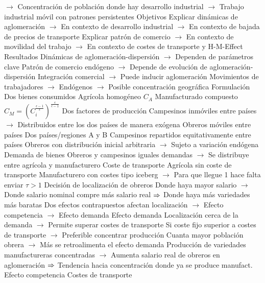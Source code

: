 \documentclass{nuevotema}
\begin{document}
\begin{esquemal}
				\4[] $\to$ Concentración de población donde hay desarrollo industrial
				\4[] $\to$ Trabajo industrial móvil con patrones persistentes
				\4 Objetivos
				\4[] Explicar dinámicas de aglomeración
				\4[] $\to$ En contexto de desarrollo industrial
				\4[] $\to$ En contexto de bajada de precios de transporte
				\4[] Explicar patrón de comercio
				\4[] $\to$ En contexto de movilidad del trabajo
				\4[] $\to$ En contexto de costes de transporte y H-M-Effect
				\4 Resultados
				\4[] Dinámicas de aglomeración-dispersión
				\4[] $\to$ Dependen de parámetros clave
				\4[] Patrón de comercio endógeno
				\4[] $\to$ Depende de evolución de aglomeración-dispersión
				\4[] Integración comercial
				\4[] $\to$ Puede inducir aglomeración
				\4[] Movimientos de trabajadores
				\4[] $\to$ Endógenos
				\4[] $\to$ Posible concentración geográfica
			\3 Formulación
				\4 Dos bienes consumidos
				\4[] Agrícola homogéneo $C_A$
				\4[] Manufacturado compuesto $C_M = \left( C_i^{\frac{\epsilon-1}{\epsilon}} \right)^{\frac{\epsilon}{\epsilon-1}}$
				\4 Dos factores de producción
				\4[] Campesinos inmóviles entre países
				\4[] $\to$ Distribuidos entre los dos países de manera exógena
				\4[] Obreros móviles entre países
				\4 Dos países/regiones A y B
				\4[] Campesinos repartidos equitativamente entre países
				\4[] Obreros con distribución inicial arbitraria
				\4[] $\to$ Sujeto a variación endógena
				\4 Demanda de bienes
				\4[] Obreros y campesinos iguales demandas
				\4[] $\to$ Se distribuye entre agrícola y manufacturero
				\4 Coste de transporte
				\4[] Agrícola sin coste de transporte
				\4[] Manufacturero con costes tipo iceberg
				\4[] $\to$ Para que llegue 1 hace falta enviar $\tau > 1$
				\4 Decisión de localización de obreros
				\4[] Donde haya mayor salario
				\4[] $\to$ Donde salario nominal compre más salario real
				\4[] $\Rightarrow$ Donde haya más variedades más baratas
				\4[] Dos efectos contrapuestos afectan localización
				\4[] $\to$ Efecto competencia
				\4[] $\to$ Efecto demanda
				\4 Efecto demanda
				\4[] Localización cerca de la demanda
				\4[] $\to$ Permite superar costes de transporte
				\4[] Si coste fijo superior a costes de transporte
				\4[] $\to$ Preferible concentrar producción
				\4[] Cuanta mayor población obrera
				\4[] $\to$ Más se retroalimenta el efecto demanda
				\4[] Producción de variedades manufactureras concentradas
				\4[] $\to$ Aumenta salario real de obreros en aglomeración
				\4[] $\Rightarrow$ Tendencia hacia concentración donde ya se produce manufact.
				\4 Efecto competencia
				\4[] Costes de transporte

\end{esquemal}
\end{document}
